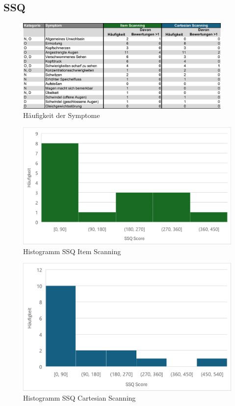 \subsection{SSQ} 

\begin{figure}[tbh]
 \centering
\includegraphics[width=0.95\textwidth]{images/Results/SSQ-Table-2.png}
 \caption{Häufigkeit der Symptome}
 \label{fig:tableSymptomsSSQ}
\end{figure}

\begin{figure}[tbh]
 \centering
\includegraphics{images/Results/Histogramm-SSQScores-Item.png}
 \caption{Histogramm SSQ Item Scanning}
 \label{fig:histoSSQItem}
\end{figure}

\begin{figure}[tbh]
 \centering
\includegraphics{images/Results/Histogramm-SSQScores-Cartesian.png}
 \caption{Histogramm SSQ Cartesian Scanning}
 \label{fig:histoSSQCartesain}
\end{figure}

